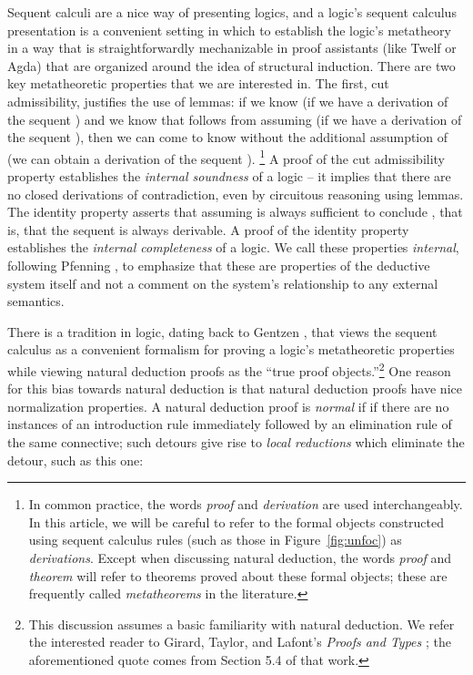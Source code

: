 \documentclass[acmtocl]{robtrans}\pdfoutput=1
\begin{document}
Sequent calculi are a nice way of presenting logics, and a logic's
sequent calculus presentation is a convenient setting in which to
establish the logic's metatheory in a way that is straightforwardly
mechanizable in proof assistants (like Twelf or Agda) that are
organized around the idea of structural induction.  There are two key
metatheoretic properties that we are interested in.  The first, cut
admissibility, justifies the use of lemmas: if we know  (if we have
a derivation of the sequent ) and we know that 
follows from assuming  (if we have a derivation of the sequent
), then we can come to know  without the
additional assumption of  (we can obtain a derivation of the
sequent ). \footnote{In common practice, the words
 {\it proof} and {\it derivation} are used interchangeably.  In this
 article, we will be careful to refer to the formal objects
 constructed using sequent calculus rules (such as those in
 Figure~\ref{fig:unfoc}) as {\it derivations}.  Except when
 discussing natural deduction, the words {\it proof} and {\it
   theorem} will refer to theorems proved about these formal objects;
 these are frequently called {\it metatheorems} in the literature.} 
A
proof of the cut admissibility property establishes the {\it internal
  soundness} of a logic -- it implies that there are no closed 
derivations
of contradiction, even by circuitous reasoning using lemmas. The
identity property asserts that assuming  is always sufficient to
conclude , that is, that the sequent  is always
derivable. A proof of the identity property establishes the {\it
  internal completeness} of a logic. We call these properties
\emph{internal}, following Pfenning ,
to emphasize that these are properties of the deductive system itself
and not a comment on the system's relationship to any external
semantics.

There is a tradition in logic, dating back to Gentzen
, that views the sequent calculus
as a convenient formalism for proving a logic's metatheoretic
properties while viewing natural deduction proofs as the ``true proof
objects.''\footnote{This discussion assumes a basic familiarity with
  natural deduction. We refer the interested reader to
  Girard, Taylor, and Lafont's {\it Proofs and Types}
  \cite{girard89proofs}; the aforementioned quote comes from Section
  5.4 of that work.}  One reason for this bias towards natural
deduction is that natural deduction proofs have nice normalization
properties.  A natural deduction proof is {\it normal} if if there are
no instances of an introduction rule immediately followed by an
elimination rule of the same connective; such detours give rise to
{\it local reductions} which eliminate the detour, such as this one:
\end{document}
